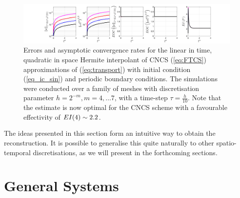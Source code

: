 \documentclass[final]{amsart}
\numberwithin{equation}{section}
\begin{document}
\begin{figure}[H] 
	\includegraphics[width=\textwidth]{../figures/fig_CNCS_plots_1x5_sin_IC_ind_uniform_P2}	
	\caption{
		\label{fig:FTCS_prelim_P2}
		Errors and asymptotic convergence rates for the linear in time,
		quadratic in space Hermite interpolant of CNCS (\ref{eq:FTCS})
		approximations of (\ref{eq:transport}) with initial condition
		(\ref{eq_ic_sin}) and periodic boundary conditions. The simulations were conducted over a family of
		meshes with discretisation parameter $h = 2^{-m}, m = 4,\dots 7$,
		with a time-step $\tau = \tfrac{h}{10}$. Note that the estimate
		is now optimal for the CNCS scheme with a favourable effectivity of
		$EI \!\left({4}\right) \sim 2.2$.}
\end{figure}

The ideas presented in this section form an intuitive way to obtain
the reconstruction. It is possible to generalise this quite naturally
to other spatio-temporal discretisations, as we will present in the
forthcoming sections.

\section{General Systems}\label{sec:numerical_discretisation}

\end{document}
